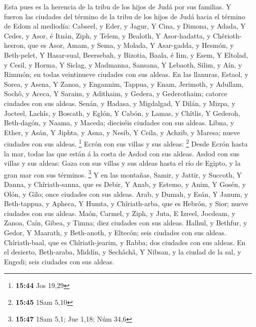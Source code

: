  Esta pues es la herencia de la tribu de los hijos de
Judá por sus familias.  Y fueron las ciudades del término
de la tribu de los hijos de Judá hacia el término de Edom al mediodía:
Cabseel, y Eder, y Jagur,  Y Cina, y Dimona, y Adada,
 Y Cedes, y Asor, é Itnán,  Ziph, y Telem,
y Bealoth,  Y Asor-hadatta, y Chêrioth-hesron, que es
Asor,  Amam, y Sema, y Molada,  Y
Asar-gadda, y Hesmón, y Beth-pelet,  Y Hasar-sual,
Beersebah, y Bizotia,  Baala, é Iim, y Esem,
 Y Eltolad, y Cesil, y Horma,  Y Siclag, y
Madmanna, Sansana,  Y Lebaoth, Silim, y Aín, y Rimmón; en
todas veintinueve ciudades con sus aldeas.  En las
llanuras, Estaol, y Sorea, y Asena,  Y Zanoa, y Engannim,
Tappua, y Enam,  Jerimoth, y Adullam, Sochô, y Aceca,
 Y Saraim, y Adithaim, y Gedera, y Gederothaim; catorce
ciudades con sus aldeas.  Senán, y Hadasa, y Migdalgad,
 Y Dilán, y Mizpa, y Jocteel,  Lachîs, y
Boscath, y Eglón,  Y Cabón, y Lamas, y Chîtlis,
 Y Gederoh, Beth-dagón, y Naama, y Maceda; dieciséis
ciudades con sus aldeas.  Libna, y Ether, y Asán,
 Y Jiphta, y Asna, y Nesib,  Y Ceila, y
Achzib, y Maresa; nueve ciudades con sus aldeas. \footnote{\textbf{15:44}
  Jos 19,29}  Ecrón con sus villas y sus aldeas:
\footnote{\textbf{15:45} 1Sam 5,10}  Desde Ecrón hasta la
mar, todas las que están á la costa de Asdod con sus aldeas.
 Asdod con sus villas y sus aldeas: Gaza con sus villas y
sus aldeas hasta el río de Egipto, y la gran mar con sus términos.
\footnote{\textbf{15:47} 1Sam 5,1; Jue 1,18; Núm 34,6}  Y
en las montañas, Samir, y Jattir, y Succoth,  Y Danna, y
Chîriath-sanna, que es Debir,  Y Anab, y Estemo, y Anim,
 Y Gosén, y Olón, y Gilo; once ciudades con sus aldeas.
 Arab, y Dumah, y Esán,  Y Janum, y
Beth-tappua, y Apheca,  Y Humta, y Chîriath-arba, que es
Hebrón, y Sior; nueve ciudades con sus aldeas.  Maón,
Carmel, y Ziph, y Juta,  E Izreel, Jocdeam, y Zanoa,
 Caín, Gibea, y Timna; diez ciudades con sus aldeas.
 Halhul, y Bethfur, y Gedor,  Y Maarath, y
Beth-anoth, y Eltecón; seis ciudades con sus aldeas. 
Chîriath-baal, que es Chîriath-jearim, y Rabba; dos ciudades con sus
aldeas.  En el desierto, Beth-araba, Middín, y Sechâchâ,
 Y Nibsan, y la ciudad de la sal, y Engedi; seis ciudades
con sus aldeas.

